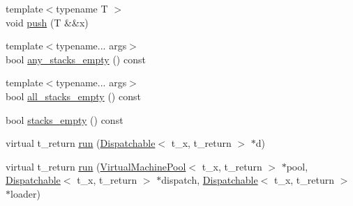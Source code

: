 \begin{DoxyCompactItemize}
\item 
{\footnotesize template$<$typename T $>$ }\\void \hyperlink{class_virtual_machine_state_a38b4d61ff92f6f13ab184c5411332c2c}{push} (T \&\&x)
\item 
{\footnotesize template$<$typename... args$>$ }\\bool \hyperlink{class_virtual_machine_state_ae62e9afd2ae0922a1e77eb6822972b7c}{any\+\_\+stacks\+\_\+empty} () const
\item 
{\footnotesize template$<$typename... args$>$ }\\bool \hyperlink{class_virtual_machine_state_af5c8da89ae5f3ef809d22f1bf0a1147b}{all\+\_\+stacks\+\_\+empty} () const
\item 
bool \hyperlink{class_virtual_machine_state_aa9290fe5ec7bc78a3b57c9623c856f32}{stacks\+\_\+empty} () const
\item 
virtual t\+\_\+return \hyperlink{class_virtual_machine_state_a40ab4e4c5ba5dd5a2940df1a6823acee}{run} (\hyperlink{class_dispatchable}{Dispatchable}$<$ t\+\_\+x, t\+\_\+return $>$ $\ast$d)
\item 
virtual t\+\_\+return \hyperlink{class_virtual_machine_state_acfeedf82cf17b47d18fc592f8031e0a8}{run} (\hyperlink{class_virtual_machine_pool}{Virtual\+Machine\+Pool}$<$ t\+\_\+x, t\+\_\+return $>$ $\ast$pool, \hyperlink{class_dispatchable}{Dispatchable}$<$ t\+\_\+x, t\+\_\+return $>$ $\ast$dispatch, \hyperlink{class_dispatchable}{Dispatchable}$<$ t\+\_\+x, t\+\_\+return $>$ $\ast$loader)
\end{DoxyCompactItemize}
